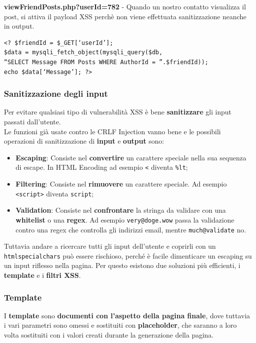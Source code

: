 \documentclass{article}
\begin{document}
\textbf{viewFriendPosts.php?userId=782} - Quando un nostro contatto visualizza il post, si attiva il payload XSS perchè non viene
effettuata sanitizzazione neanche in output.
\begin{verbatim}
<? $friendId = $_GET[‘userId’];
$data = mysqli_fetch_object(mysqli_query($db, 
“SELECT Message FROM Posts WHERE AuthorId = ”.$friendId));
echo $data[‘Message’]; ?>
\end{verbatim}

\newpage
\subsubsection{Sanitizzazione degli input}
Per evitare qualsiasi tipo di vulnerabilità XSS è bene \textbf{sanitizzare} gli input passati dall'utente.\\ Le funzioni già usate contro le CRLF Injection vanno bene e le possibili operazioni di sanitizzazione di \textbf{input} e \textbf{output} sono:
\begin{itemize}
	\item \textbf{Escaping}: Consiste nel \textbf{convertire} un carattere speciale nella sua sequenza di escape. In HTML Encoding ad esempio \verb|<| diventa \verb|%lt|;
	
	\item \textbf{Filtering}: Consiste nel \textbf{rimuovere} un carattere speciale. Ad esempio \verb|<script>| diventa \verb|script|;
	
	\item \textbf{Validation}: Consiste nel \textbf{confrontare} la stringa da validare con una \textbf{whitelist} o una \textbf{regex}.
	Ad esempio \verb|very@doge.wow| passa  la validazione contro una regex che controlla gli indirizzi email, mentre \verb|much@validate| no.
\end{itemize} 

Tuttavia andare a ricercare tutti gli input dell’utente e coprirli con un \verb|htmlspecialchars| può essere rischioso, perché è facile dimenticare un escaping su un input riflesso nella pagina.
Per questo esistono due soluzioni più efficienti, i \textbf{template} e i \textbf{filtri XSS}.

\subsubsection{Template}
I \textbf{template} sono \textbf{documenti con l’aspetto della pagina finale}, dove tuttavia i vari parametri sono omessi e sostituiti con \textbf{placeholder}, che saranno a loro volta sostituiti con i valori creati durante la generazione della pagina. 
\end{document}

